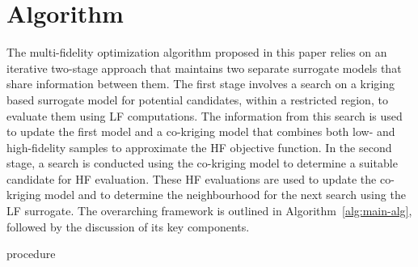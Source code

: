 \section{\AlgName{} Algorithm}\label{sec:method}

The multi-fidelity optimization algorithm proposed in this paper relies on an iterative two-stage approach that maintains two separate surrogate models that share information between them. The first stage involves a search on a kriging based surrogate model for potential candidates, within a restricted region, to evaluate them using LF computations. The information from this search is used to update the first model and a co-kriging model that combines both low- and high-fidelity samples to approximate the HF objective function. In the second stage, a search is conducted using the co-kriging model to determine a suitable candidate for HF evaluation. These HF evaluations are used to update the co-kriging model and to determine the neighbourhood for the next search using the LF surrogate. The overarching framework is outlined in Algorithm~\ref{alg:main-alg}, followed by the discussion of its key components.  

\begin{algorithm}[h!]
\caption{\AlgName{} procedure}
\label{alg:main-alg}
{\footnotesize 
\begin{algorithmic}[1]
 
 
  
   
   
   
   
   
   
   
   
     
  \ENDIF
\ENDWHILE
\end{algorithmic}
}
\end{algorithm}

